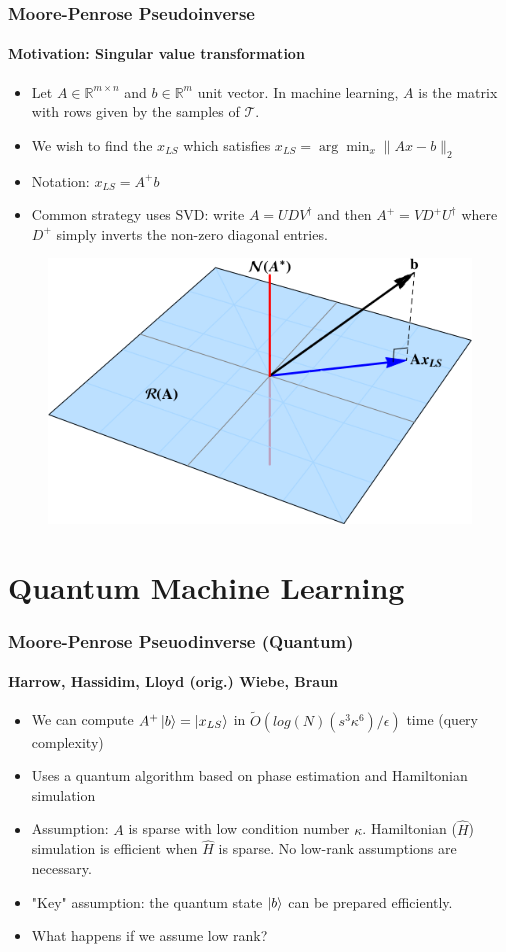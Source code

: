 \documentclass{beamer}
\newcommand\0{\mathbf{0}}
\newcommand\RR{\mathbb{R}}
\newcommand\<{\langle}
\renewcommand\>{\rangle}
\begin{document}
\begin{frame}
\frametitle{Moore-Penrose Pseudoinverse}
    \framesubtitle{Motivation: Singular value transformation}
    \begin{itemize}
    \item Let $A \in \RR^{m \times n}$ and $b \in \RR^m$ unit vector. In machine learning, $A$ is the matrix with rows given by the samples of $\mathcal{T}$. 
    \item We wish to find the $x_{LS}$ which satisfies $x_{LS} = \arg\min_{x} \| Ax - b \|_2$
    \item Notation: $x_{LS} = A^+ b$
    \pause
    \item Common strategy uses SVD: write $A = UDV^\dag$ and then $A^+ = VD^+U^\dag$ where $D^+$ simply inverts the non-zero diagonal entries.
    \end{itemize}
	\begin{figure}
   \includegraphics[width= 0.5\linewidth]{least-squares.png}	
\end{figure}
\end{frame}

\section{Quantum Machine Learning}

\begin{frame}
\frametitle{Moore-Penrose Pseuodinverse (Quantum)}
\framesubtitle{Harrow, Hassidim, Lloyd (orig.) Wiebe, Braun} 
\begin{itemize}
    \item We can compute $A^+ \ket{b} = \ket{x_{LS}}$ in $\tilde{O}(log(N)(s^3\kappa^6)/ \epsilon)$ time (query complexity)
    \item Uses a quantum algorithm based on phase estimation and Hamiltonian simulation
    \item Assumption: $A$ is sparse with low condition number $\kappa$. Hamiltonian ($\hat{H}$) simulation is efficient when $\hat{H}$ is sparse. No low-rank assumptions are necessary.
    \item "Key" assumption: the quantum state $\ket{b}$ can be prepared efficiently.	
    \item What happens if we assume low rank?
\end{itemize}
\end{frame}
\end{document}
